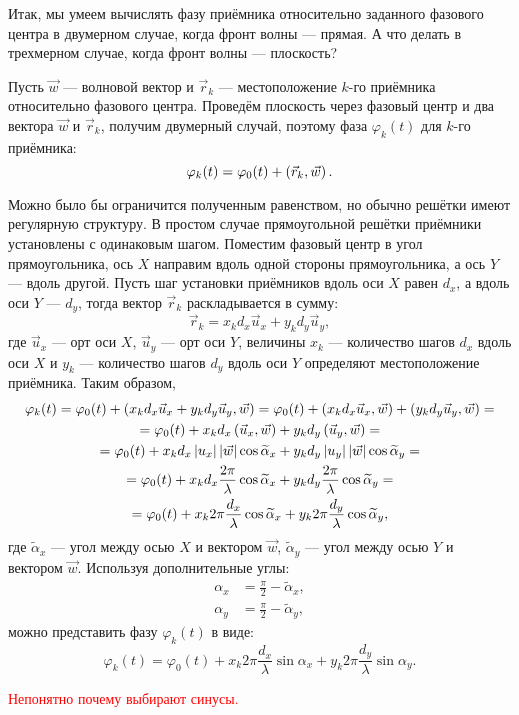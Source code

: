 Итак, мы умеем вычислять фазу приёмника относительно заданного фазового центра в двумерном случае, когда фронт волны --- прямая. А что делать в трехмерном случае, когда фронт
волны --- плоскость?

Пусть $\vec{w}$ --- волновой вектор и $\vec{r}_k$ --- местоположение $k$-го приёмника относительно фазового центра. Проведём плоскость через фазовый центр и два вектора $\vec{w}$
и $\vec{r}_k$, получим двумерный случай, поэтому фаза $\varphi_k(t)$ для $k$-го приёмника:
\[
    \varphi_k(t) = \varphi_0(t) + \left ( \vec{r}_k, \vec{w} \right ) .
\]

Можно было бы ограничится полученным равенством, но обычно решётки имеют регулярную структуру. В простом случае прямоугольной решётки приёмники установлены с одинаковым шагом.
Поместим фазовый центр в угол прямоугольника, ось $X$ направим вдоль одной стороны прямоугольника, а ось $Y$ --- вдоль другой. Пусть шаг установки приёмников вдоль оси $X$
равен $d_x$, а вдоль оси $Y$ --- $d_y$, тогда вектор $\vec{r}_k$ раскладывается в сумму:
\[
    \vec{r}_k = x_k d_x \vec{u}_x + y_k d_y \vec{u}_y,
\]
где $\vec{u}_x$ --- орт оси $X$, $\vec{u}_y$ --- орт оси $Y$, величины $x_k$ --- количество шагов $d_x$ вдоль оси $X$ и $y_k$ --- количество шагов $d_y$ вдоль оси $Y$
определяют местоположение приёмника. Таким образом,
\begin{multline*}
    \varphi_k(t)
    = \varphi_0(t) + \left ( x_k d_x \vec{u}_x + y_k d_y \vec{u}_y, \vec{w} \right )
    = \varphi_0(t) + \left ( x_k d_x \vec{u}_x, \vec{w} \right ) + \left ( y_k d_y \vec{u}_y, \vec{w} \right ) = \\
    = \varphi_0(t) + x_k d_x \left ( \vec{u}_x, \vec{w} \right ) + y_k d_y \left ( \vec{u}_y, \vec{w} \right ) = \\
    = \varphi_0(t) + x_k d_x \left | u_x \right | \left | \vec{w} \right | \cos \widetilde{\alpha}_x + y_k d_y \left | u_y \right | \left | \vec{w} \right | \cos \widetilde{\alpha}_y = \\
    = \varphi_0(t) + x_k d_x \frac{2 \pi}{\lambda} \cos \widetilde{\alpha}_x + y_k d_y \frac{2 \pi}{\lambda} \cos \widetilde{\alpha}_y = \\
    = \varphi_0(t) + x_k 2 \pi \frac{d_x}{\lambda} \cos \widetilde{\alpha}_x + y_k 2 \pi \frac{d_y}{\lambda} \cos \widetilde{\alpha}_y,
\end{multline*}
где $\widetilde{\alpha}_x$ --- угол между осью $X$ и вектором $\vec{w}$, $\widetilde{\alpha}_y$ --- угол между осью $Y$ и вектором $\vec{w}$. Используя дополнительные углы:
\begin{align*}
    \alpha_x & = \frac{\pi}{2} - \widetilde{\alpha}_x, \\
    \alpha_y & = \frac{\pi}{2} - \widetilde{\alpha}_y,
\end{align*}
можно представить фазу $\varphi_k(t)$ в виде:
\[
    \varphi_k(t)
    = \varphi_0(t) + x_k 2 \pi \frac{d_x}{\lambda} \sin \alpha_x + y_k 2 \pi \frac{d_y}{\lambda} \sin \alpha_y .
\]

\textcolor{red}{Непонятно почему выбирают синусы.}
